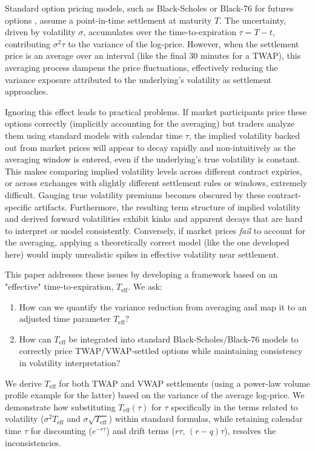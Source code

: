 \documentclass[11pt]{article}
\theoremstyle{plain}
\begin{document}
Standard option pricing models, such as Black-Scholes \citep{blackscholes1973pricing, merton1973theory} or Black-76 for futures options \citep{black1976pricing}, assume a point-in-time settlement at maturity $T$. The uncertainty, driven by volatility $\sigma$, accumulates over the time-to-expiration $\tau = T-t$, contributing $\sigma^2 \tau$ to the variance of the log-price. However, when the settlement price is an average over an interval (like the final 30 minutes for a TWAP), this averaging process dampens the price fluctuations, effectively reducing the variance exposure attributed to the underlying's volatility as settlement approaches.

Ignoring this effect leads to practical problems. If market participants price these options correctly (implicitly accounting for the averaging) but traders analyze them using standard models with calendar time $\tau$, the implied volatility backed out from market prices will appear to decay rapidly and non-intuitively as the averaging window is entered, even if the underlying's true volatility is constant. This makes comparing implied volatility levels across different contract expiries, or across exchanges with slightly different settlement rules or windows, extremely difficult. Gauging true volatility premiums becomes obscured by these contract-specific artifacts. Furthermore, the resulting term structure of implied volatility and derived forward volatilities exhibit kinks and apparent decays that are hard to interpret or model consistently. Conversely, if market prices \textit{fail} to account for the averaging, applying a theoretically correct model (like the one developed here) would imply unrealistic spikes in effective volatility near settlement.

This paper addresses these issues by developing a framework based on an "effective" time-to-expiration, $T_{\mathrm{eff}}$. We ask:
\begin{enumerate}
    \item How can we quantify the variance reduction from averaging and map it to an adjusted time parameter $T_{\mathrm{eff}}$?
    \item How can $T_{\mathrm{eff}}$ be integrated into standard Black-Scholes/Black-76 models to correctly price TWAP/VWAP-settled options while maintaining consistency in volatility interpretation?
\end{enumerate}
We derive $T_{\mathrm{eff}}$ for both TWAP and VWAP settlements (using a power-law volume profile example for the latter) based on the variance of the average log-price. We demonstrate how substituting $T_{\mathrm{eff}}(\tau)$ for $\tau$ specifically in the terms related to volatility ($\sigma^2 T_{\mathrm{eff}}$ and $\sigma \sqrt{T_{\mathrm{eff}}}$) within standard formulas, while retaining calendar time $\tau$ for discounting ($e^{-r\tau}$) and drift terms ($r\tau$, $(r-q)\tau$), resolves the inconsistencies.
\end{document}
